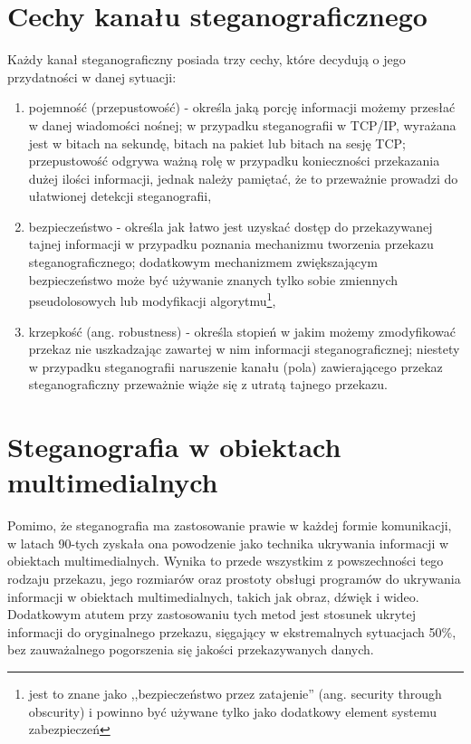 \documentclass[a4paper,12pt,twoside,openany]{report}
\begin{document}
\section{Cechy kanału steganograficznego}
Każdy kanał steganograficzny posiada trzy cechy, które decydują o jego 
przydatności w danej sytuacji:
\begin{enumerate}
	\item pojemność (przepustowość) - określa jaką porcję informacji możemy 
przesłać w danej wiadomości nośnej; w przypadku steganografii w TCP/IP, wyrażana 
jest w bitach na sekundę, bitach na pakiet lub bitach na sesję TCP; 
przepustowość odgrywa ważną rolę w przypadku konieczności przekazania dużej 
ilości informacji, jednak należy pamiętać, że to przeważnie prowadzi do 
ułatwionej detekcji steganografii,
	\item bezpieczeństwo - określa jak łatwo jest uzyskać dostęp do 
przekazywanej tajnej informacji w przypadku poznania mechanizmu tworzenia 
przekazu steganograficznego; dodatkowym mechanizmem zwiększającym bezpieczeństwo 
może być używanie znanych tylko sobie zmiennych pseudolosowych lub modyfikacji 
algorytmu\footnote{jest to znane jako ,,bezpieczeństwo przez zatajenie'' (ang. 
security through obscurity) i powinno być używane tylko jako dodatkowy element 
systemu zabezpieczeń},
	\item krzepkość (ang. robustness) - określa stopień w jakim możemy 
zmodyfikować przekaz nie uszkadzając zawartej w nim informacji 
steganograficznej; niestety w przypadku steganografii naruszenie kanału (pola) 
zawierającego przekaz steganograficzny przeważnie wiąże się z utratą tajnego 
przekazu.
\end{enumerate}

\section{Steganografia w obiektach multimedialnych}
\label{sectionSteganografiaWObiektachMultimedialnych}
Pomimo, że steganografia ma zastosowanie prawie w każdej formie komunikacji, w 
latach 90-tych zyskała ona powodzenie jako technika ukrywania informacji w 
obiektach multimedialnych. Wynika to przede wszystkim z powszechności tego 
rodzaju przekazu, jego rozmiarów oraz prostoty obsługi programów do ukrywania 
informacji w obiektach multimedialnych, takich jak obraz, dźwięk i wideo. 
Dodatkowym atutem przy zastosowaniu tych metod jest stosunek ukrytej informacji 
do oryginalnego przekazu, sięgający w ekstremalnych sytuacjach 50\%, bez 
zauważalnego pogorszenia się jakości przekazywanych danych.
\end{document}
